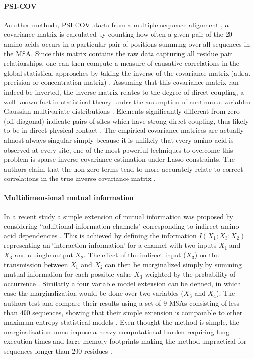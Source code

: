\paragraph{PSI-COV}
As other methods, PSI-COV starts from a multiple sequence alignment \cite{jones2012psicov}, a covariance matrix is calculated by counting how often a given pair of the 20 amino acids occurs in a particular pair of positions summing over all sequences in the MSA. 
Since this matrix contains the raw data capturing all residue pair relationships, one can then compute a measure of causative correlations in the global statistical approaches by taking the inverse of the covariance matrix (a.k.a. precision or concentration matrix) \cite{jones2012psicov, marks2012protein}.
Assuming that this covariance matrix can indeed be inverted, the inverse matrix relates to the degree of direct coupling, a well known fact in statistical theory under the assumption of continuous variables Gaussian multivariate distributions \cite{marks2012protein}.
Elements significantly different from zero (off-diagonal) indicate pairs of sites which have strong direct coupling, thus likely to be in direct physical contact \cite{jones2012psicov}.
The empirical covariance matrices are actually almost always singular simply because it is unlikely that every amino acid is observed at every site, one of the most powerful techniques to overcome this problem is sparse inverse covariance estimation under Lasso constraints.
The authors claim that the non-zero terms tend to more accurately relate to correct correlations in the true inverse covariance matrix \cite{jones2012psicov}.

\paragraph{Multidimensional mutual information}
In a recent study a simple extension of mutual information was proposed by considering ``additional information channels" corresponding to indirect
amino acid dependencies \cite{clark2014multidimensional}.
This is achieved by defining the information $I(X_1 ; X_3 ; X_2)$ representing an `interaction information' for a channel with two inputs $X_1$ and $X_3$ and a single output $X_2$.
The effect of the indirect input ($X_3$) on the transmission between $X_1$ and $X_2$ can then be marginalized simply by summing mutual information for each possible value $X_3$ weighted by the probability of occurrence \cite{clark2014multidimensional}.
Similarly a four variable model extension can be defined, in which case the marginalization would be done over two variables ($X_3$ and $X_4$).
The authors test and compare their results using a set of $9$ MSAs consisting of less than $400$ sequences, showing that their simple extension is comparable to other maximum entropy statistical models \cite{clark2014multidimensional}.
Even thought the method is simple, the marginalization sums impose a heavy computational burden requiring long execution times and large memory footprints making the method impractical for sequences longer than 200 residues \cite{clark2014multidimensional}.

